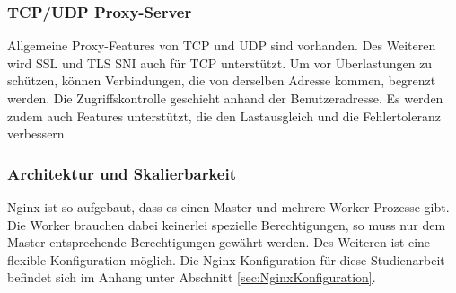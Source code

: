 \subsubsection{TCP/UDP Proxy-Server}
\label{sec:NginxTCP/UDP Proxy-Server}
Allgemeine Proxy-Features von \ac{TCP} und \ac{UDP} sind vorhanden. Des Weiteren wird \ac{SSL} und \ac{TLS} \ac{SNI} auch für \ac{TCP} unterstützt.
Um vor Überlastungen zu schützen, können Verbindungen, die von derselben Adresse kommen, begrenzt werden. Die Zugriffskontrolle geschieht anhand der Benutzeradresse. Es werden zudem auch Features unterstützt, die den Lastausgleich und die Fehlertoleranz verbessern.


\subsubsection{Architektur und Skalierbarkeit}
\label{sec:NginxArchitektur und Skalierbarkeit}
Nginx ist so aufgebaut, dass es einen Master und mehrere Worker-Prozesse gibt. Die Worker brauchen dabei keinerlei spezielle Berechtigungen, so muss nur dem Master entsprechende Berechtigungen gewährt werden. Des Weiteren ist eine flexible Konfiguration möglich. Die Nginx Konfiguration für diese Studienarbeit befindet sich im Anhang unter Abschnitt \ref {sec:NginxKonfiguration}.
